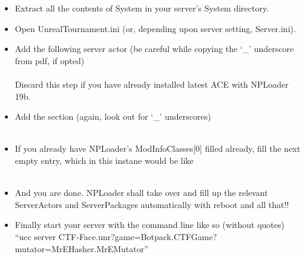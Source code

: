 \documentclass{article}
\theoremstyle{definition}
\newcommand{\FileColor}[1]{{\color{Purple} #1}}
\newcommand{\FolderColor}[1]{{\color{mygray} #1}}
\begin{document}
\begin{itemize}
\item Extract all the contents of \FolderColor{System} in your server's \FolderColor{System} directory.
\item Open \FileColor{UnrealTournament.ini} (or, depending upon server setting, \FileColor{Server.ini}).
\item Add the following server actor (be careful while copying the `\_' underscore from pdf, if opted)\\
\\
Discard this step if you have already installed latest ACE with NPLoader 19b.
\item Add the section (again, look out for `\_' underscores) \\

\\
\item If you already have NPLoader's ModInfoClasses[0] filled already, fill the next empty entry, which in this instane would be like\\

\\

\item And you are done. NPLoader shall take over and fill up the relevant ServerActors and ServerPackages automatically with reboot and all that!!
\item Finally start your server with the command line like so (without quotes)\\
``ucc server CTF-Face.unr?game=Botpack.CTFGame?mutator=MrEHasher.MrEMutator''

\end{itemize}
\end{document}
